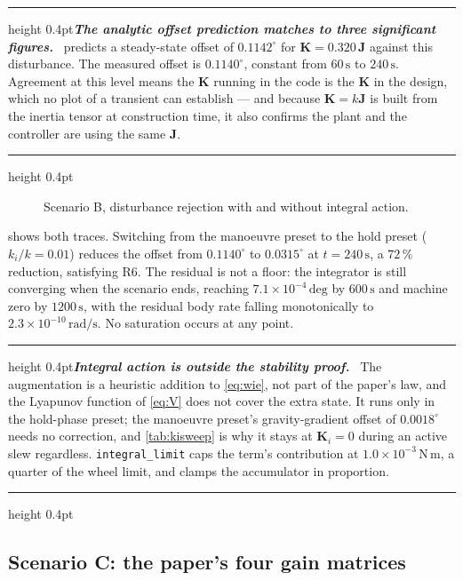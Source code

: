 \documentclass[conference,10pt,a4paper]{IEEEtran}
\newcommand{\remarkrule}{\par\nobreak\vspace{2pt}%
  \hrule height 0.4pt\vspace{4pt}\nobreak}
\newenvironment{keybox}[1][Result]
  {\par\medskip\remarkrule\noindent\small\textbf{\textit{#1.}}\ \ignorespaces}
  {\par\vspace{3pt}\hrule height 0.4pt\par\medskip\ignorespacesafterend}
\newenvironment{cautionbox}[1][Caveat]
  {\par\medskip\remarkrule\noindent\small\textbf{\textit{#1.}}\ \ignorespaces}
  {\par\vspace{3pt}\hrule height 0.4pt\par\medskip\ignorespacesafterend}
\newif\ifdraftmode
\newcommand{\figplaceholder}[2]{%
  \ifdraftmode
    \setlength{\fboxsep}{4pt}%
    \fbox{%
      \parbox[c][#1][c]{\dimexpr\linewidth-2\fboxsep-2\fboxrule\relax}{%
        \centering\scriptsize\textsc{figure placeholder}\\[3pt]
        \itshape #2}}%
  \else
    \parbox[c][#1][c]{\linewidth}{}%
  \fi}
\newcommand{\mat}[1]{\bm{#1}}
\newcommand{\unit}[1]{\ensuremath{\,\mathrm{#1}}}
\begin{document}
\begin{keybox}[The analytic offset prediction matches to three significant figures]
 predicts a steady-state offset of $0.1142^\circ$ for
$\mat{K}=0.320\,\mat{J}$ against this disturbance. The measured offset is
$0.1140^\circ$, constant from $60\unit{s}$ to $240\unit{s}$. Agreement at this
level means the $\mat{K}$ running in the code is the $\mat{K}$ in the design,
which no plot of a transient can establish --- and because $\mat{K}=k\mat{J}$ is
built from the inertia tensor at construction time, it also confirms the plant
and the controller are using the same $\mat{J}$.
\end{keybox}

\begin{figure}[!t]
\centering
\figplaceholder{44mm}{Error angle under the constant bias, with and without the
integral augmentation on the same axes, and the analytic offset of
$0.1142^\circ$ drawn as a horizontal line.}
\caption{Scenario B, disturbance rejection with and without integral action.}
\label{fig:disturbance}
\end{figure}

 shows both traces. Switching from the manoeuvre preset
to the hold preset ($k_i/k=0.01$) reduces the offset from $0.1140^\circ$ to
$0.0315^\circ$ at $t=240\unit{s}$, a $72\,\%$ reduction, satisfying R6. The
residual is not a floor: the integrator is still converging when the scenario
ends, reaching $7.1\times10^{-4}\unit{deg}$ by $600\unit{s}$ and machine zero
by $1200\unit{s}$, with the residual body rate falling monotonically to
$2.3\times10^{-10}\unit{rad/s}$. No saturation occurs at any point.

\begin{cautionbox}[Integral action is outside the stability proof]
The augmentation is a heuristic addition to \cref{eq:wie}, not part of the
paper's law, and the Lyapunov function of \cref{eq:V} does not cover the extra
state. It runs only in the hold-phase preset; the manoeuvre preset's
gravity-gradient offset of $0.0018^\circ$ needs no correction, and
\cref{tab:kisweep} is why it stays at $\mat{K}_i=0$ during an active slew
regardless. \texttt{integral\_limit} caps the term's contribution at
$1.0\times10^{-3}\unit{N\,m}$, a quarter of the wheel limit, and clamps the
accumulator in proportion.
\end{cautionbox}

\subsection{Scenario C: the paper's four gain matrices}
\label{sec:scenarioC}
\end{document}
